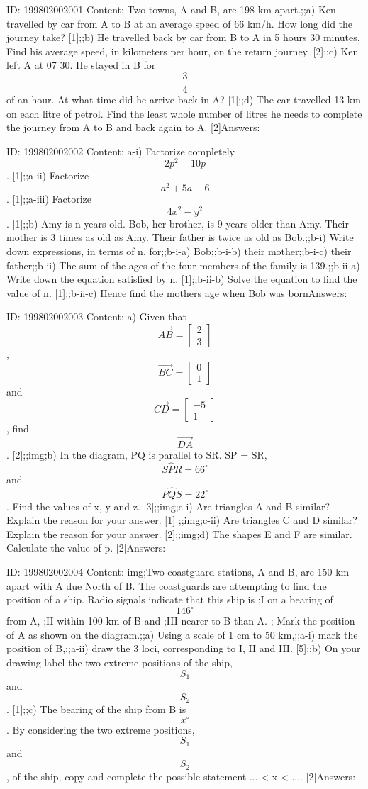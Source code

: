 \documentclass{article}
\begin{document}
ID: 199802002001
Content:
Two towns, A and B, are 198 km apart.;;a) Ken travelled by car from A to B at an average speed of 66 km/h. How long did the journey take? [1];;b) He travelled back by car from B to A in 5 hours 30 minutes. Find his average speed, in kilometers per hour, on the return journey. [2];;c) Ken left A at 07 30. He stayed in B for $$\frac{3}{4}$$ of an hour. At what time did he arrive back in A? [1];;d) The car travelled 13 km on each litre of petrol. Find the least whole number of litres he needs to complete the journey from A to B and back again to A. [2]Answers:

ID: 199802002002
Content:
a-i) Factorize completely $$2p^2-10p$$. [1];;a-ii) Factorize $$a^2+5a-6$$. [1];;a-iii) Factorize $$4x^{2} -y^{2} $$. [1];;b) Amy is n years old. Bob, her brother, is 9 years older than Amy. Their mother is 3 times as old as Amy. Their father is twice as old as Bob.;;b-i) Write down expressions, in terms of n, for;;b-i-a) Bob;;b-i-b) their mother;;b-i-c) their father;;b-ii) The sum of the ages of the four members of the family is 139.;;b-ii-a) Write down the equation satisfied by n. [1];;b-ii-b) Solve the equation to find the value of n. [1];;b-ii-c) Hence find the mothers age when Bob was bornAnswers:

ID: 199802002003
Content:
a) Given that $$\vec{AB}=\begin{bmatrix}2\\3\end{bmatrix}$$, $$\vec{BC}=\begin{bmatrix}0\\1\end{bmatrix}$$ and $$\vec{CD}= \begin{bmatrix}-5\\1\end{bmatrix}$$, find $$\vec{DA}$$. [2];;img;b) In the diagram, PQ is parallel to SR. SP = SR, $$S \hat PR=66^{\circ}$$ and $$P \hat QS=22^{\circ}$$. Find the values of x, y and z. [3];;img;c-i) Are triangles A and B similar? Explain the reason for your answer. [1] ;;img;c-ii) Are triangles C and D similar? Explain the reason for your answer. [2];;img;d) The shapes E and F are similar. Calculate the value of p. [2]Answers:

ID: 199802002004
Content:
img;Two coastguard stations, A and B, are 150 km apart with A due North of B. The coastguards are attempting to find the position of a ship. Radio signals indicate that this ship is ;I	on a bearing of $$146^{\circ}$$ from A, ;II within 100 km of B and ;III nearer to B than A. ; Mark the position of A as shown on the diagram.;;a) Using a scale of 1 cm to 50 km,;;a-i) mark the position of B,;;a-ii) draw the 3 loci, corresponding to I, II and III. [5];;b) On your drawing label the two extreme positions of the ship, $$S_1$$ and $$S_2$$. [1];;c) The bearing of the ship from B is $$x^{\circ}$$. By considering the two extreme positions, $$S_1$$ and $$S_2$$, of the ship, copy and complete the possible statement ... < x < .... [2]Answers:
\end{document}

